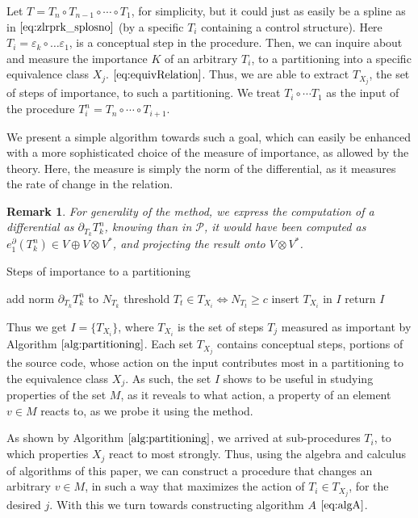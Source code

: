 \documentclass{article}
\newcommand{\dP}{\mathcal{P}}
\newcommand{\D}{\partial}
\newtheorem{opomba}{Remark}[section]
\begin{document}
  Let $T=T_n\circ T_{n-1}\circ\cdots\circ T_1$, for simplicity, but it could just as easily be a spline as in $\eqref{eq:zlrprk_splosno}$ (by a specific $T_i$ containing a control structure). Here $T_i=\varepsilon_k\circ\ldots \varepsilon_1$, is a conceptual step in the procedure. Then, we can inquire about and measure the importance $K$ of an arbitrary $T_i$, to a partitioning into a specific equivalence class $X_j$. $\eqref{eq:equivRelation}$. Thus, we are able to extract $T_{X_j}$, the set of steps of importance, to such a partitioning. We treat $T_i\circ\cdots T_1$ as the input of the procedure $T^n_i=T_n\circ\cdots\circ T_{i+1}$.
  
  We present a simple algorithm towards such a goal, which can easily be enhanced with a more sophisticated choice of the measure of importance, as allowed by the theory. Here, the measure is simply the norm of the differential, as it measures the rate of change in the relation.
  
  \begin{opomba}
  For generality of the method, we express the computation of a differential as $\D_{T_k}T^n_k$, knowing than in $\dP$, it would have been computed as $e^\D_1(T^n_k)\in V\oplus V\otimes V^*$, and projecting the result onto $V\otimes V^*$.
  \end{opomba}
  
  
\begin{algorithm}[H]
\caption{Steps of importance to a partitioning}
\label{alg:partitioning}
\begin{algorithmic}[1]
\State add norm $\D_{T_k}T^n_k$ to $N_{T_k}$
\EndFor
\EndFor
\State threshold $T_t\in T_{X_i}\iff N_{T_t}\ge c$  
\State insert $T_{X_i}$ in $I$
\EndFor
\State return $I$
\EndProcedure
\end{algorithmic}
\end{algorithm}
Thus we get $I=\{T_{X_i}\}$, where $T_{X_i}$ is the set of steps $T_j$ measured as important by Algorithm $\ref{alg:partitioning}$. Each set $T_{X_j}$ contains conceptual steps, portions of the source code, whose action on the input contributes most in a partitioning to the equivalence class $X_j$. As such, the set $I$ shows to be useful in studying properties of the set $M$, as it reveals to what action, a property of an element $v\in M$ reacts to, as we probe it using the method.

As shown by Algorithm $\ref{alg:partitioning}$, we arrived at sub-procedures $T_i$, to which properties $X_j$ react to most strongly. Thus, using the algebra and calculus of algorithms of this paper, we can construct a procedure that changes an arbitrary $v\in M$, in such a way that maximizes the action of $T_i\in T_{X_j}$, for the desired $j$. With this we turn towards constructing algorithm $A$ $\eqref{eq:algA}$.
  \printbibliography
\end{document}
